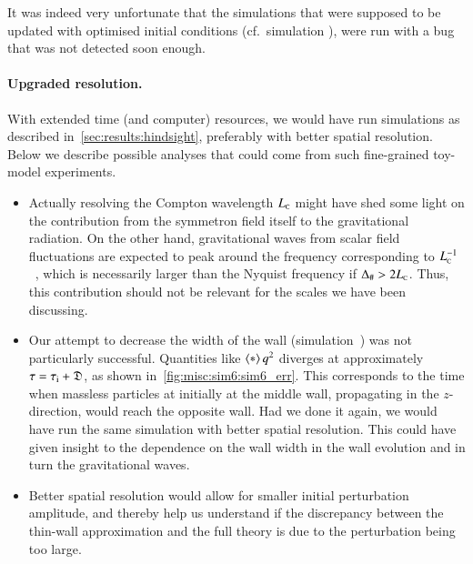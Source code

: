 It was indeed very unfortunate that the simulations that were supposed to be updated with optimised initial conditions (cf.~simulation ), were run with a bug that was not detected soon enough. 

\paragraph{Upgraded resolution.} %
With extended time (and computer) resources, we would have run simulations as described in~\cref{sec:results:hindsight}, preferably with better spatial resolution. Below we describe possible analyses that could come from such fine-grained toy-model experiments.
\begin{itemize}
    \item Actually resolving the Compton wavelength $L_{\text{\tiny{C}}}$ might have shed some light on the contribution from the symmetron field itself to the gravitational radiation. On the other hand, gravitational waves from scalar field fluctuations are expected to peak around the frequency corresponding to $L_{\text{\tiny{C}}}^{-1}$~\citep{kawasakiStudyGravitationalRadiation2011}, which is necessarily larger than the Nyquist frequency if $\Delta_\# > 2L_{\text{\tiny{C}}}$. Thus, this contribution should not be relevant for the scales we have been discussing.
    \item Our attempt to decrease the width of the wall (simulation~) was not particularly successful. Quantities like $\left\langle{*}\right\rangle{q^2}$ diverges at approximately $\tau={\tau_\mathrm{i}+ \mathfrak{D}}$, as shown in~\cref{fig:misc:sim6:sim6_err}. This corresponds to the time when massless particles at initially at the middle wall, propagating in the $z$-direction, would reach the opposite wall. 
    Had we done it again, we would have run the same simulation with better spatial resolution. This could have given insight to the dependence on the wall width in the wall evolution and in turn the gravitational waves.
    \item Better spatial resolution would allow for smaller initial perturbation amplitude, and thereby help us understand if the discrepancy between the thin-wall approximation and the full theory is due to the perturbation being too large.
\end{itemize}
